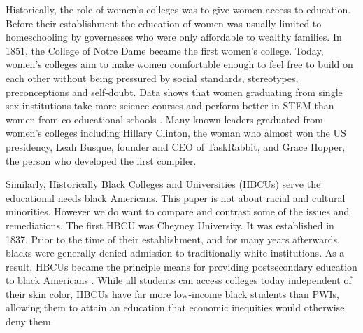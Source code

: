 \documentclass[utf8]{frontiersSCNS} %
\begin{document}
Historically, the role of women's colleges was to give women access to education. Before their establishment the  education of women was usually limited to homeschooling by governesses who were only affordable to wealthy families.  In 1851, the College of Notre Dame became the first women's college. Today, women's colleges aim to make women comfortable enough to feel free to build on each other without being pressured by social standards, stereotypes, preconceptions and self-doubt. Data shows that women graduating from single sex institutions take more science courses and perform better in STEM than women from co-educational schools \citep{organisation2015abc}. Many known leaders graduated from women's colleges including Hillary Clinton, the woman who almost won the US presidency, Leah Busque, founder and CEO of TaskRabbit, and Grace Hopper, the person who developed the first compiler. 


Similarly, Historically Black Colleges and Universities (HBCUs)  serve the educational needs black Americans. This paper is not about racial and cultural minorities. However we do want to compare and contrast some of the issues and remediations. The first HBCU was Cheyney University. It was established in 1837.  Prior to the time of their establishment, and for many years afterwards, blacks were generally denied admission to traditionally white institutions. As a result, HBCUs became the principle means for providing postsecondary education to black Americans \citep{BlackHistory}. %
While all students can access colleges today independent of their skin color, HBCUs have far more low-income black students than PWIs, allowing them to attain an education that economic inequities would otherwise deny them.
\end{document}
